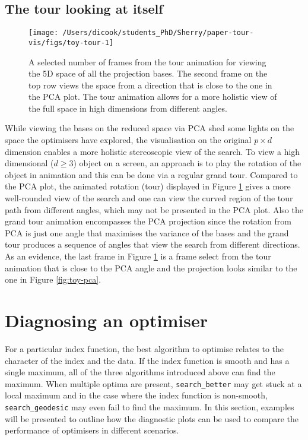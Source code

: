 \documentclass[12pt]{article}
\begin{document}
\hypertarget{the-tour-looking-at-itself}{%
\subsection{The tour looking at itself}\label{the-tour-looking-at-itself}}

\begin{figure}

{\centering \texttt{[image: /Users/dicook/students\_PhD/Sherry/paper-tour-vis/figs/toy-tour-1]} 

}

\caption{A selected number of frames from the tour animation for viewing the 5D space of all the projection bases. The second frame on the top row views the space from a direction that is close to the one in the PCA plot. The tour animation allows for a more holistic view of the full space in high dimensions from different angles.}\label{fig:toy-tour}
\end{figure}



While viewing the bases on the reduced space via PCA shed some lights on the space the optimisers have explored, the visualisation on the original \(p \times d\) dimension enables a more holistic stereoscopic view of the search. To view a high dimensional (\(d \ge 3\)) object on a screen, an approach is to play the rotation of the object in animation and this can be done via a regular grand tour. Compared to the PCA plot, the animated rotation (tour) displayed in Figure \ref{fig:toy-tour} gives a more well-rounded view of the search and one can view the curved region of the tour path from different angles, which may not be presented in the PCA plot. Also the grand tour animation encompasses the PCA projection since the rotation from PCA is just one angle that maximises the variance of the bases and the grand tour produces a sequence of angles that view the search from different directions. As an evidence, the last frame in Figure \ref{fig:toy-tour} is a frame select from the tour animation that is close to the PCA angle and the projection looks similar to the one in Figure \ref{fig:toy-pca}.

\hypertarget{application}{%
\section{Diagnosing an optimiser}\label{application}}

For a particular index function, the best algorithm to optimise relates to the character of the index and the data. If the index function is smooth and has a single maximum, all of the three algorithms introduced above can find the maximum. When multiple optima are present, \texttt{search\_better} may get stuck at a local maximum and in the case where the index function is non-smooth, \texttt{search\_geodesic} may even fail to find the maximum. In this section, examples will be presented to outline how the diagnostic plots can be used to compare the performance of optimisers in different scenarios.
\end{document}
